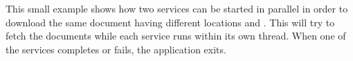 \documentclass{ozdoc}
\begin{document}



This small example shows how two services can be started in parallel in order to download the same document having different locations  and . This will try to fetch the documents while each service runs within its own thread. When one of the services completes or fails, the application exits. \mozartEMPTY
 \mozartEMPTY



 \mozartEMPTY
\begin{mozartCODEDISPLAY}\mozartFACETEXT{\mozartNEWLINE
}\mozartFACETEXT{\mozartSPACE{}}\mozartFACETEXT{\mozartSPACE{}\mozartNEWLINE
}
\end{mozartCODEDISPLAY}
\end{document}
